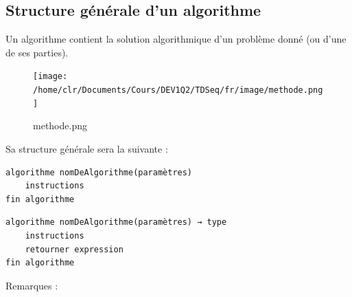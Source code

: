 \documentclass[11pt,a4paper]{article}
\begin{document}
        \subsection{Structure g\'en\'erale d'un algorithme}
          Un algorithme contient la solution algorithmique d'un probl\`eme donn\'e (ou d'une de ses parties).
        
            \par
        \begin{figure}[hbt]
				    \begin{center}
					\texttt{[image: /home/clr/Documents/Cours/DEV1Q2/TDSeq/fr/image/methode.png]}
						\end{center}
                
                    \caption[methode.png]{methode.png}
                \end{figure}
                    
            \par
        
          Sa structure g\'en\'erale sera la suivante :
        
            \par
        \begin{verbatim}
algorithme nomDeAlgorithme(paramètres)
    instructions
fin algorithme
				\end{verbatim}\begin{verbatim}
algorithme nomDeAlgorithme(paramètres) → type
    instructions
    retourner expression
fin algorithme
				\end{verbatim}
          Remarques :
          
\end{document}

